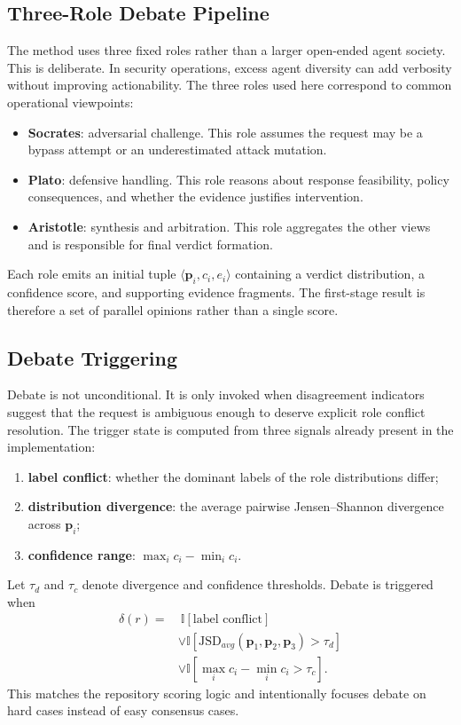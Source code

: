 \subsection{Three-Role Debate Pipeline}

The method uses three fixed roles rather than a larger open-ended agent society. This is deliberate. In security operations, excess agent diversity can add verbosity without improving actionability. The three roles used here correspond to common operational viewpoints:
\begin{itemize}
  \item \textbf{Socrates}: adversarial challenge. This role assumes the request may be a bypass attempt or an underestimated attack mutation.
  \item \textbf{Plato}: defensive handling. This role reasons about response feasibility, policy consequences, and whether the evidence justifies intervention.
  \item \textbf{Aristotle}: synthesis and arbitration. This role aggregates the other views and is responsible for final verdict formation.
\end{itemize}

Each role emits an initial tuple $\langle \mathbf{p}_i, c_i, e_i \rangle$ containing a verdict distribution, a confidence score, and supporting evidence fragments. The first-stage result is therefore a set of parallel opinions rather than a single score.

\subsection{Debate Triggering}

Debate is not unconditional. It is only invoked when disagreement indicators suggest that the request is ambiguous enough to deserve explicit role conflict resolution. The trigger state is computed from three signals already present in the implementation:
\begin{enumerate}
  \item \textbf{label conflict}: whether the dominant labels of the role distributions differ;
  \item \textbf{distribution divergence}: the average pairwise Jensen--Shannon divergence across $\mathbf{p}_i$;
  \item \textbf{confidence range}: $\max_i c_i - \min_i c_i$.
\end{enumerate}

Let $\tau_d$ and $\tau_c$ denote divergence and confidence thresholds. Debate is triggered when
\begin{equation}
\begin{aligned}
\delta(r) = &\ \mathbb{I}[\text{label conflict}] \\
& \lor \mathbb{I}[\mathrm{JSD}_{avg}(\mathbf{p}_1,\mathbf{p}_2,\mathbf{p}_3) > \tau_d] \\
& \lor \mathbb{I}[\max_i c_i - \min_i c_i > \tau_c].
\end{aligned}
\end{equation}
This matches the repository scoring logic and intentionally focuses debate on hard cases instead of easy consensus cases.

